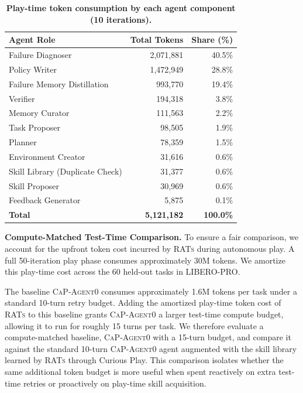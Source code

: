 \begin{table}[htbp]
    \centering
    \caption{\textbf{Play-time token consumption by each agent component (10 iterations).}}
    \label{tab:play_time_tokens}
    \begin{tabular}{lrr}
        \toprule
        \textbf{Agent Role} & \textbf{Total Tokens} & \textbf{Share (\%)} \\
        \midrule
        Failure Diagnoser & 2,071,881 & 40.5\% \\
        Policy Writer & 1,472,949 & 28.8\% \\
        Failure Memory Distillation & 993,770 & 19.4\% \\
        Verifier & 194,318 & 3.8\% \\
        Memory Curator & 111,563 & 2.2\% \\
        Task Proposer & 98,505 & 1.9\% \\
        Planner & 78,359 & 1.5\% \\
        Environment Creator & 31,616 & 0.6\% \\
        Skill Library (Duplicate Check) & 31,377 & 0.6\% \\
        Skill Proposer & 30,969 & 0.6\% \\
        Feedback Generator & 5,875 & 0.1\% \\
        \midrule
        \textbf{Total} & \textbf{5,121,182} & \textbf{100.0\%} \\
        \bottomrule
    \end{tabular}
\end{table}

\textbf{Compute-Matched Test-Time Comparison.} To ensure a fair comparison, we account for the
upfront token cost incurred by \textsc{RATs} during autonomous play. A full 50-iteration play phase
consumes approximately 30M tokens. We amortize this play-time cost across the 60 held-out tasks in
LIBERO-PRO.

The baseline \textsc{CaP-Agent0} consumes approximately 1.6M tokens per task under a standard
10-turn retry budget. Adding the amortized play-time token cost of \textsc{RATs} to this baseline
grants \textsc{CaP-Agent0} a larger test-time compute budget, allowing it to run for roughly 15 turns
per task. We therefore evaluate a compute-matched baseline, \textsc{CaP-Agent0} with a 15-turn
budget, and compare it against the standard 10-turn \textsc{CaP-Agent0} agent augmented with the
skill library learned by \textsc{RATs} through Curious Play. This comparison isolates whether the
same additional token budget is more useful when spent reactively on extra test-time retries or
proactively on play-time skill acquisition.


